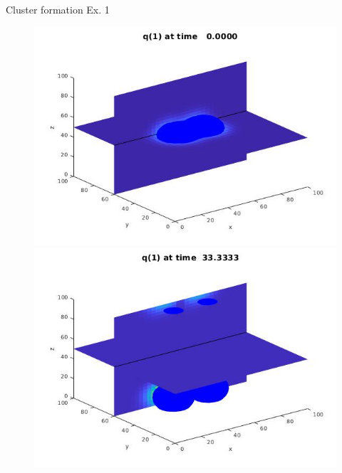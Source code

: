     \begin{frame}{Cluster formation Ex. 1}
    		\scriptsize
    		\begin{figure}[H]
    			\centering
    			\begin{minipage}{0.4\textwidth}
    				\includegraphics[scale=0.21]{Bilder_3D/2Glocken_uzk_2Cluster_t=0}
    			\end{minipage}
    			\hfill 
    			\begin{minipage}{0.4\textwidth}
    				\includegraphics[scale=0.21]{Bilder_3D/2Glocken_uzk_2Cluster_t=33}

\end{minipage}
\end{figure}
\end{frame}

